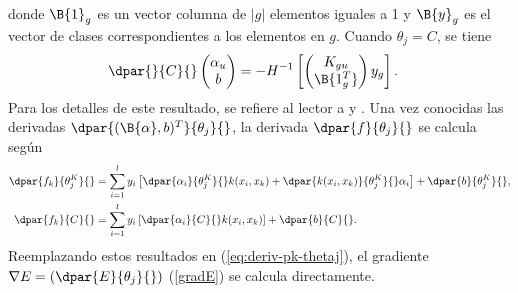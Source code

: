%
donde $\B{1}_g$ es un vector columna de $|g|$ elementos iguales a 1 y
$\B{y}_g$ es el vector de clases correspondientes a los elementos en
$g$.
Cuando $\theta_j = C$, se tiene
%
\begin{align}
  \dpar{}{C}{} \begin{pmatrix}\alpha_{u}\\b\end{pmatrix} &=
    -H^{-1} \left[
      \begin{pmatrix}{K_{gu}}\\\B{1_g^T}\end{pmatrix} y_g
      \right].
\end{align}
%
Para los detalles de este resultado, se refiere al lector a
\cite{glasmachers} y \cite{keerthi}.
Una vez conocidas las derivadas
$\dpar{({\B{\alpha},b})^T}{\theta_j}{}$, la derivada
$\dpar{f}{\theta_j}{}$ se calcula según
%
\begin{align}
  \dpar{f_k}{\theta^K_j}{} &=  \sum_{i=1}^l y_i \left[
    \dpar{\alpha_i}{\theta^K_j}{} k(x_i,x_k) +
    \dpar{k(x_i,x_k)}{\theta^K_j}{} \alpha_i \right]
  + \dpar{b}{\theta^K_j}{}, \\
    \dpar{f_k}{C}{} &=  \sum_{i=1}^l y_i\left[
    \dpar{\alpha_i}{C}{} k(x_i,x_k) \right]
  + \dpar{b}{C}{}.
\end{align}
%
Reemplazando estos resultados en (\ref{eq:deriv-pk-thetaj}), el
gradiente $\nabla{}E=\left(\dpar{E}{\theta_j}{}\right)$ (\ref{gradE})
se calcula directamente.
